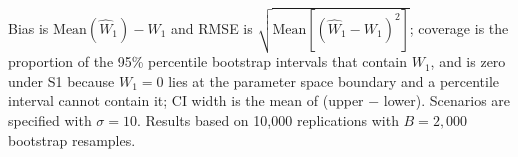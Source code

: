 \documentclass[AMA,Times1COL]{WileyNJDv5}
\begin{document}
\begin{table}[ht]
\centering
\caption{Bias, coverage of the 95\% percentile bootstrap confidence interval, RMSE and mean CI width of $\widehat{W}_1$ by scenario and sample size, in the original units of the effect modifier.\label{tab:estimation}}
\begin{tablenotes}
\item Bias is $\text{Mean}(\widehat{W}_1) - W_1$ and RMSE is $\sqrt{\text{Mean}[(\widehat{W}_1 - W_1)^2]}$; coverage is the proportion of the 95\% percentile bootstrap intervals that contain $W_1$, and is zero under S1 because $W_1 = 0$ lies at the parameter space boundary and a percentile interval cannot contain it; CI width is the mean of (upper $-$ lower). Scenarios are specified with $\sigma = 10$. Results based on 10{,}000 replications with $B = 2{,}000$ bootstrap resamples.
\end{tablenotes}
\end{table}


\end{document}
